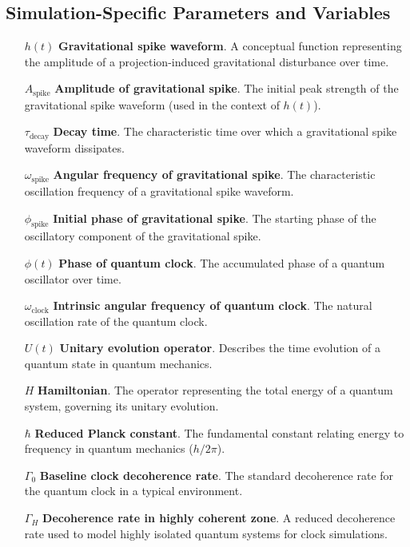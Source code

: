 \documentclass[12pt,a4paper]{article}
\numberwithin{equation}{section}
\begin{document}
\subsection{Simulation-Specific Parameters and Variables}
\begin{itemize}
    \item[$h(t)$] \textbf{Gravitational spike waveform}. A conceptual function representing the amplitude of a projection-induced gravitational disturbance over time.
    \item[$A_{\text{spike}}$] \textbf{Amplitude of gravitational spike}. The initial peak strength of the gravitational spike waveform (used in the context of $h(t)$).
    \item[$\tau_{\text{decay}}$] \textbf{Decay time}. The characteristic time over which a gravitational spike waveform dissipates.
    \item[$\omega_{\text{spike}}$] \textbf{Angular frequency of gravitational spike}. The characteristic oscillation frequency of a gravitational spike waveform.
    \item[$\phi_{\text{spike}}$] \textbf{Initial phase of gravitational spike}. The starting phase of the oscillatory component of the gravitational spike.
    \item[$\phi(t)$] \textbf{Phase of quantum clock}. The accumulated phase of a quantum oscillator over time.
    \item[$\omega_{\text{clock}}$] \textbf{Intrinsic angular frequency of quantum clock}. The natural oscillation rate of the quantum clock.
    \item[$U(t)$] \textbf{Unitary evolution operator}. Describes the time evolution of a quantum state in quantum mechanics.
    \item[$H$] \textbf{Hamiltonian}. The operator representing the total energy of a quantum system, governing its unitary evolution.
    \item[$\hbar$] \textbf{Reduced Planck constant}. The fundamental constant relating energy to frequency in quantum mechanics ($h/2\pi$).
    \item[$\Gamma_0$] \textbf{Baseline clock decoherence rate}. The standard decoherence rate for the quantum clock in a typical environment.
    \item[$\Gamma_H$] \textbf{Decoherence rate in highly coherent zone}. A reduced decoherence rate used to model highly isolated quantum systems for clock simulations.
\end{itemize}
\end{document}
